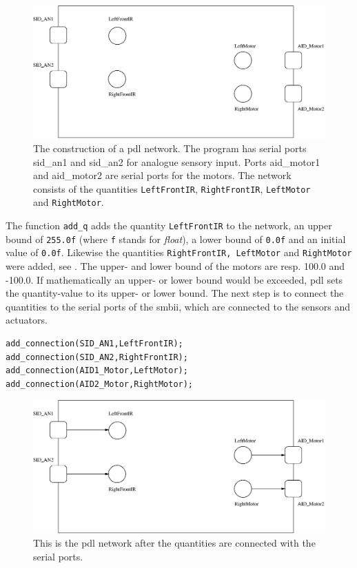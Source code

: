 \begin{figure}
\centerline{\includegraphics[width=12cm]{robots//pdl_networka.eps}}
\caption{The construction of a {\sc pdl} network. The program has serial ports {\sc sid\_an1} and {\sc sid\_an2} for analogue sensory input. Ports {\sc aid\_motor1} and {\sc aid\_motor2} are serial ports for the motors. The network consists of the quantities \texttt{LeftFrontIR}, \texttt{RightFrontIR}, \texttt{LeftMotor} and \texttt{RightMotor}.}
\label{f:robots:pdl_networka}
\end{figure}
\noindent
The function \texttt{add\_q} adds the quantity \texttt{LeftFrontIR} to the network, an upper bound of \texttt{255.0f} (where \texttt{f} stands for {\em float}), a lower bound of \texttt{0.0f} and an initial value of \texttt{0.0f}. Likewise the quantities \texttt{RightFrontIR, LeftMotor} and \texttt{RightMotor} were added, see . The upper- and lower bound of the motors are resp. 100.0 and -100.0. If mathematically an upper- or lower bound would be exceeded, {\sc pdl} sets the quantity-value to its upper- or lower bound. The next step is to connect the quantities to the serial ports of the {\sc smbii}, which are connected to the sensors and actuators.


{\footnotesize\begin{verbatim}
add_connection(SID_AN1,LeftFrontIR);
add_connection(SID_AN2,RightFrontIR);
add_connection(AID1_Motor,LeftMotor);
add_connection(AID2_Motor,RightMotor);
\end{verbatim}}

\begin{figure}
\centerline{\includegraphics[width=12cm]{robots//pdl_networkb.eps}}
\caption{This is the {\sc pdl} network after the quantities are connected with the serial ports.}
\label{f:robots:pdl_networkb}
\end{figure}



